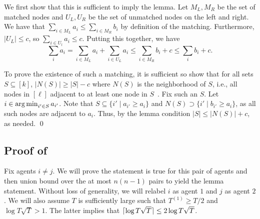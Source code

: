 We first show that this is sufficient to imply the lemma. Let $M_L, M_R$ be the set of matched nodes and $U_L, U_R$ be the set of unmatched nodes on the left and right. We have that $\sum_{i \in M_L} a_i \le \sum_{i \in M_R} b_i$ by definition of the matching. Furthermore, $|U_L| \le c$, so $\sum_{i \in U_l} a_i \le c$. Putting this together, we have
\[
    \sum_i a_i = \sum_{i \in M_L} a_i + \sum_{i \in U_L} a_i \le \sum_{i \in M_R} b_i + c \le \sum_i b_i + c.
\]

To prove the existence of such a matching, it is sufficient so show that for all sets $S \subseteq [k]$, $|N(S)| \ge |S| - c$ where $N(S)$ is the neighborhood of $S$, i.e., all nodes in $[\ell]$ adjacent to at least one node in $S$~\cite{lovasz2009matching}. Fix such an $S$. Let $i \in \operatorname*{arg\,min}_{i' \in S} a_{i'}$. Note that $S \subseteq \{i' \mid a_{i'} \ge a_i\}$ and $N(S) \supset \{i' \mid b_{i'} \ge a_i\}$, as all such nodes are adjacent to $a_i$. Thus, by the lemma condition $|S| \le |N(S)| + c$, as needed. \qed



\subsection{Proof of }

        Fix agents $i \ne j$. We will prove the statement is true for this pair of agents and then union bound over the at most $n(n - 1)$ pairs to yield the lemma statement. Without loss of generality, we will relabel $i$ as agent $1$ and $j$ as agent $2$. We will also assume $T$ is sufficiently large such that $T^{(1)} \ge T / 2$ and $\log T \sqrt{T} > 1$. The latter implies that $\lceil\log T \sqrt{T}\rceil \le 2 \log T \sqrt{T}$. 



